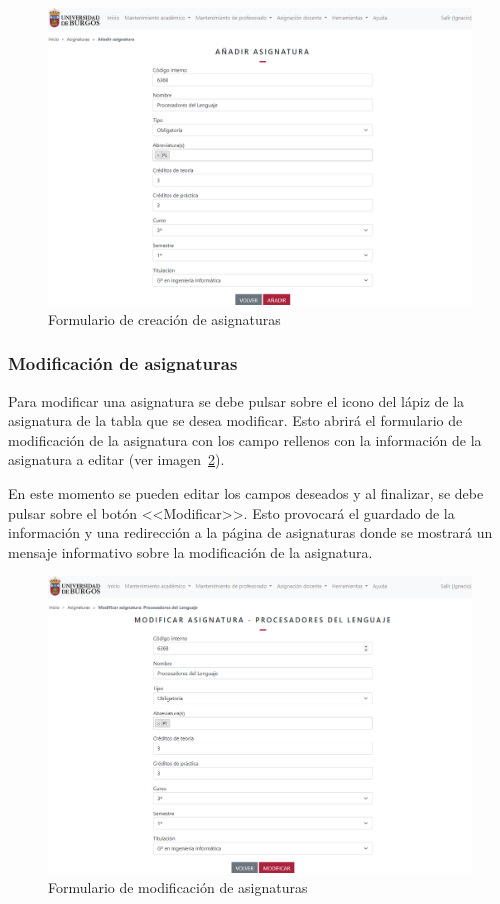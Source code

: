 \begin{figure}
	\centering
	\includegraphics[width=\textwidth]{../img/Anexos/Manual usuario/formAsignatura.png}
	\caption{Formulario de creación de asignaturas}\label{pag:formAsignatura}
\end{figure}

\subsubsection{Modificación de asignaturas}
Para modificar una asignatura se debe pulsar sobre el icono del lápiz de la asignatura de la tabla que se desea modificar.
Esto abrirá el formulario de modificación de la asignatura con los campo rellenos con la información de la asignatura a editar (ver imagen~\ref{pag:formModAsignatura}).

En este momento se pueden editar los campos deseados y al finalizar, se debe pulsar sobre el botón <<Modificar>>.
Esto provocará el guardado de la información y una redirección a la página de asignaturas donde se mostrará un mensaje informativo sobre la modificación de la asignatura.

\begin{figure}
	\centering
	\includegraphics[width=\textwidth]{../img/Anexos/Manual usuario/formModAsignatura.png}
	\caption{Formulario de modificación de asignaturas}\label{pag:formModAsignatura}
\end{figure}

